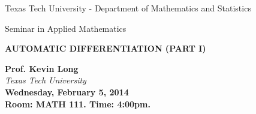 \documentclass[oneside]{article}
\newcommand{\talktitle}{Automatic Differentiation (part I)}
\newcommand{\talkspeaker}{ \textbf{\sc Prof. Kevin Long}\\ \textit{Texas Tech University}}
\newcommand{\talkdate}{\textbf{Wednesday, February 5, 2014}}
\newcommand{\timelocation}{\textbf{Room: MATH 111.  Time: 4:00pm.}}
\newcommand{\talkabstract}{
Abstract of the talk
}
\begin{document}

\vspace*{-2cm}
\begin{center}
{\LARGE Texas Tech University - Department of Mathematics and Statistics }

\vspace{0.2cm}
{\LARGE Seminar in Applied Mathematics }


\medskip

\vspace{1cm}

\textbf{\Huge {\uppercase{\talktitle}} }

\vspace{1cm}

{\LARGE
\talkspeaker\\
\talkdate\\
\timelocation
}

\vspace*{10pt}

\end{center}



% 
% 
% 
% 
% 
\end{document}
